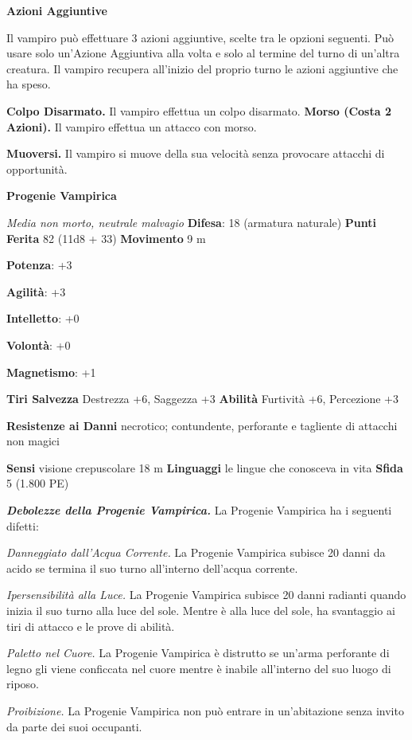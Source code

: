\begin{multicols}{2}
\textbf{Azioni Aggiuntive}

Il vampiro può effettuare 3 azioni aggiuntive, scelte tra le opzioni
seguenti. Può usare solo un'Azione Aggiuntiva alla volta e solo al
termine del turno di un'altra creatura. Il vampiro recupera all'inizio
del proprio turno le azioni aggiuntive che ha speso.

\textbf{Colpo Disarmato.} Il vampiro effettua un colpo disarmato.
\textbf{Morso (Costa 2 Azioni).} Il vampiro effettua un attacco con
morso.

\textbf{Muoversi.} Il vampiro si muove della sua velocità senza
provocare attacchi di opportunità.

\textbf{Progenie Vampirica}

\emph{Media non morto, neutrale malvagio} \textbf{Difesa}: 18
(armatura naturale) \textbf{Punti Ferita} 82 (11d8 + 33)
\textbf{Movimento} 9 m

\textbf{Potenza}: +3

\textbf{Agilità}: +3

\textbf{Intelletto}: +0

\textbf{Volontà}: +0

\textbf{Magnetismo}: +1

\textbf{Tiri Salvezza} Destrezza +6, Saggezza +3 \textbf{Abilità}
Furtività +6, Percezione +3

\textbf{Resistenze ai Danni} necrotico; contundente, perforante e
tagliente di attacchi non magici

\textbf{Sensi} visione crepuscolare 18 m
\textbf{Linguaggi} le lingue che conosceva in vita \textbf{Sfida} 5
(1.800 PE)

\emph{\textbf{Debolezze della Progenie Vampirica.}} La Progenie
Vampirica ha i seguenti difetti:

\emph{Danneggiato dall'Acqua Corrente.} La Progenie Vampirica subisce 20
danni da acido se termina il suo turno all'interno dell'acqua corrente.

\emph{Ipersensibilità alla Luce.} La Progenie Vampirica subisce 20 danni
radianti quando inizia il suo turno alla luce del sole. Mentre è alla
luce del sole, ha svantaggio ai tiri di attacco e le prove di abilità.

\emph{Paletto nel Cuore.} La Progenie Vampirica è distrutto se un'arma
perforante di legno gli viene conficcata nel cuore mentre è inabile
all'interno del suo luogo di riposo.

\emph{Proibizione.} La Progenie Vampirica non può entrare in
un'abitazione senza invito da parte dei suoi occupanti.


\end{multicols}
